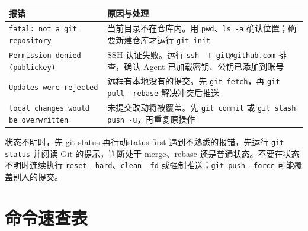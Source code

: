 \documentclass[12pt,a4paper]{ctexart}
\begin{document}
	\begin{tabularx}{\linewidth}{l X}
		\toprule
		\textbf{报错} & \textbf{原因与处理} \\
		\midrule
		\texttt{fatal: not a git repository} & 当前目录不在仓库内。用 \texttt{pwd}、\texttt{ls -a} 确认位置；确要新建仓库才运行 \texttt{git init} \\
		\texttt{Permission denied (publickey)} & SSH 认证失败。运行 \texttt{ssh -T git@github.com} 排查，确认 Agent 已加载密钥、公钥已添加到账号 \\
		\texttt{Updates were rejected} & 远程有本地没有的提交。先 \texttt{git fetch}，再 \texttt{git pull --rebase} 解决冲突后推送 \\
		\texttt{local changes would be overwritten} & 未提交改动将被覆盖。先 \texttt{git commit} 或 \texttt{git stash push -u}，再重复原操作 \\
		\bottomrule
	\end{tabularx}

	\begin{warning}{状态不明时，先 git status 再行动}{status-first}
		遇到不熟悉的报错，先运行 \texttt{git status} 并阅读 Git 的提示，判断处于 merge、rebase 还是普通状态。不要在状态不明时连续执行 \texttt{reset --hard}、\texttt{clean -fd} 或强制推送；\texttt{git push --force} 可能覆盖别人的提交。
	\end{warning}

	\section{命令速查表}
\end{document}
